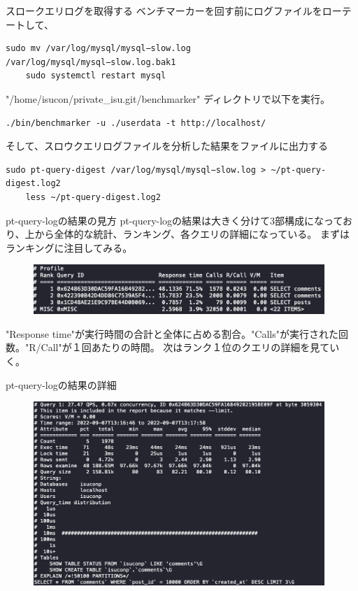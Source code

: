 \documentclass{beamer}
\begin{document}
\begin{frame}[fragile]{スロークエリログを取得する}
  ベンチマーカーを回す前にログファイルをローテートして、
  \begin{lstlisting}[basicstyle=\tiny]
    sudo mv /var/log/mysql/mysql−slow.log /var/log/mysql/mysql−slow.log.bak1
    sudo systemctl restart mysql
  \end{lstlisting}

  "/home/isucon/private\_isu.git/benchmarker" ディレクトリで以下を実行。

  \begin{lstlisting}[basicstyle=\tiny]
    ./bin/benchmarker -u ./userdata -t http://localhost/
  \end{lstlisting}

  そして、スロウクエリログファイルを分析した結果をファイルに出力する
  \begin{lstlisting}[basicstyle=\tiny]
    sudo pt-query-digest /var/log/mysql/mysql−slow.log > ~/pt-query-digest.log2
    less ~/pt-query-digest.log2
  \end{lstlisting}

\end{frame}

\begin{frame}{pt-query-logの結果の見方}
  pt-query-logの結果は大きく分けて3部構成になっており、上から全体的な統計、ランキング、各クエリの詳細になっている。
  まずはランキングに注目してみる。
  \begin{figure}
    \centering
    \includegraphics[clip, keepaspectratio, width=110mm]{./fig/rank_query.png}
  \end{figure}
  "Response time"が実行時間の合計と全体に占める割合。"Calls"が実行された回数。"R/Call"が１回あたりの時間。
  次はランク１位のクエリの詳細を見ていく。
\end{frame}

\begin{frame}{pt-query-logの結果の詳細}
  \begin{figure}
    \centering
    \includegraphics[clip, keepaspectratio, width=110mm]{./fig/select_query.png}
  \end{figure}
\end{frame}
\end{document}

